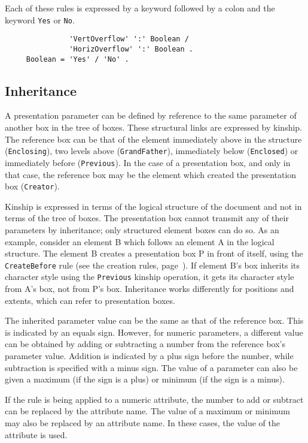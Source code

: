 Each of these rules is expressed by a keyword followed by a colon
and the keyword {\tt Yes} or {\tt No}.

\begin{verbatim}
               'VertOverflow' ':' Boolean /
               'HorizOverflow' ':' Boolean .
     Boolean = 'Yes' / 'No' .
\end{verbatim}


\subsection{Inheritance}

A presentation parameter can be defined by reference to the same
parameter of another box in the tree of boxes.  These structural links
are expressed by kinship.  The reference box can be that of the
element immediately above in the structure ({\tt Enclosing}), two
levels above ({\tt GrandFather}), immediately below ({\tt Enclosed})
or immediately before ({\tt Previous}).  In the case of a presentation
box, and only in that case, the reference box may be the element which
created the presentation box ({\tt Creator}).

Kinship is expressed in terms of the logical structure of the
document and not in terms of the tree of boxes.  The presentation box
cannot transmit any of their parameters by inheritance; only
structured element boxes can do so.  As an example, consider an
element B which follows an element A in the logical structure.  The
element B creates a presentation box P in front of itself, using the
{\tt CreateBefore} rule (see the creation rules,
page~\pageref{creation}).  If element B's box inherits its character
style using the {\tt Previous} kinship operation, it gets its
character style from A's box, not from P's box.  Inheritance works
differently for positions and extents, which can refer to presentation
boxes.

The inherited parameter value can be the same as that of the reference
box.  This is indicated by an equals sign.  However, for numeric
parameters, a different value can be obtained by adding or subtracting
a number from the reference box's parameter value.  Addition is
indicated by a plus sign before the number, while subtraction is
specified with a minus sign.  The value of a
parameter can also be given a maximum (if the sign is a plus) or
minimum (if the sign is a minus).

If the rule is being applied to a numeric attribute, the number to add
or subtract can be replaced by the attribute name.  The value of a
maximum or minimum may also be replaced by an attribute name.  In
these cases, the value of the attribute is used.

